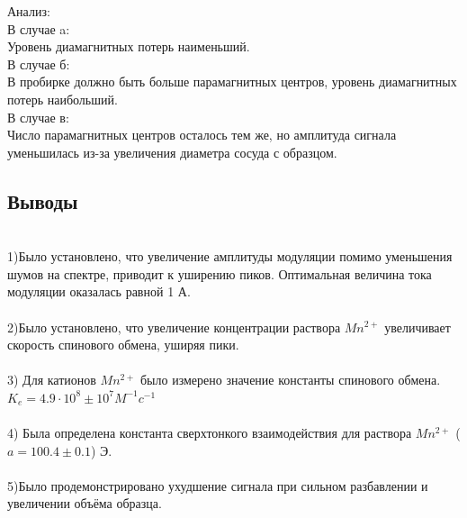 \documentclass[a4paper,12pt]{article}
\theoremstyle{plain} %
\theoremstyle{definition} %
\theoremstyle{remark} %
\begin{document}
Анализ:
\\
В случае a:\\
Уровень диамагнитных потерь наименьший.
\\В случае б:
\\ В пробирке должно быть больше парамагнитных центров, уровень диамагнитных 
потерь наибольший.
\\В случае в:
\\Число парамагнитных центров осталось тем
же, но амплитуда сигнала уменьшилась из-за увеличения диаметра
сосуда с образцом.

\newpage

\subsection{Выводы}
$\text{}$
\\1)Было установлено, что увеличение амплитуды модуляции помимо уменьшения
шумов на спектре, приводит к уширению пиков. Оптимальная
величина тока модуляции оказалась равной 1 А.
\\ \\
2)Было установлено, что увеличение концентрации раствора $Mn^{2+}$
увеличивает скорость спинового обмена, уширяя пики.\\\\
3) Для катионов $Mn^{2+}$ было измерено значение константы спинового обмена. $K_e = 4.9\cdot 10^8 \pm 10^7 M^{-1}c^{-1} $ 
\\\\4)
Была определена константа сверхтонкого взаимодействия для раствора $Mn^{2+}$ ($a = 100.4 \pm 0.1$) Э.
\\\\5)Было продемонстрировано ухудшение сигнала при сильном разбавлении
и увеличении объёма образца.
\end{document}
